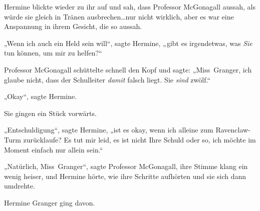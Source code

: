Hermine blickte wieder zu ihr auf und sah, dass Professor McGonagall aussah, als würde sie gleich in Tränen ausbrechen…nur nicht wirklich, aber es war eine Anspannung in ihrem Gesicht, die so aussah.

„Wenn ich auch ein Held sein will“, sagte Hermine, „gibt es irgendetwas, was \emph{Sie} tun können, um mir zu helfen?“

Professor McGonagall schüttelte schnell den Kopf und sagte: „Miss~Granger, ich glaube nicht, dass der Schulleiter \emph{damit} falsch liegt. Sie \emph{sind} zwölf.“

„Okay“, sagte Hermine.

Sie gingen ein Stück vorwärts.

„Entschuldigung“, sagte Hermine, „ist es okay, wenn ich alleine zum Ravenclaw-Turm zurücklaufe? Es tut mir leid, es ist nicht Ihre Schuld oder so, ich möchte im Moment einfach nur allein sein.“

„Natürlich, Miss~Granger“, sagte Professor McGonagall, ihre Stimme klang ein wenig heiser, und Hermine hörte, wie ihre Schritte aufhörten und sie sich dann umdrehte.

Hermine Granger ging davon.

